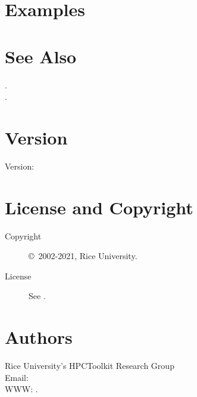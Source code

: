\documentclass[english]{article}
\begin{document}
\section{Examples}






\section{See Also}

.\\
.

\section{Version}

Version: \Version

\section{License and Copyright}

\begin{description}
\item[Copyright] \copyright\ 2002-2021, Rice University.
\item[License] See .
\end{description}

\section{Authors}

\noindent
Rice University's HPCToolkit Research Group \\
Email:  \\
WWW: .

\LatexManEnd
\end{document}
